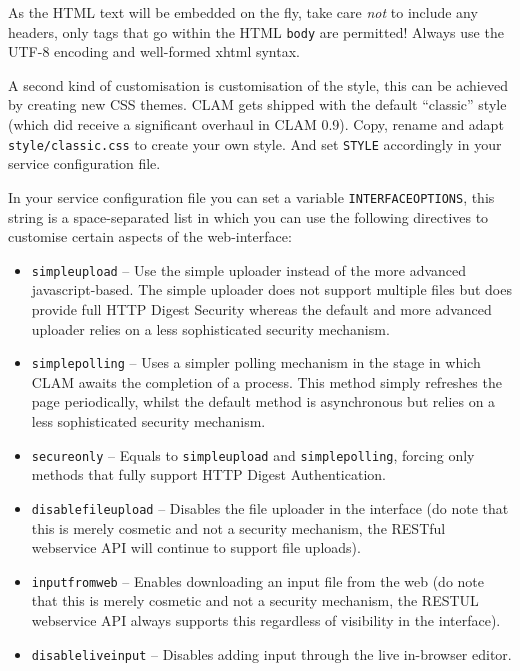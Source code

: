 \documentclass[a4paper,12pt]{report}
\begin{document}
As the HTML text will be embedded on the fly, take care \emph{not} to include
any headers, only tags that go within the HTML \texttt{body} are permitted!
Always use the UTF-8 encoding and well-formed xhtml syntax.

A second kind of customisation is customisation of the style, this can be
achieved by creating new CSS themes. CLAM gets shipped with the default
``classic'' style (which did receive a significant overhaul in CLAM 0.9). Copy,
rename and adapt \texttt{style/classic.css} to create your own style. And set
\texttt{STYLE} accordingly in your service configuration file.

In your service configuration file you can set a variable
\texttt{INTERFACEOPTIONS}, this string is a space-separated list in which you
can use the following directives to customise certain aspects of the
web-interface:

\begin{itemize}
\item \texttt{simpleupload} -- Use the simple uploader instead of the more advanced javascript-based. The simple uploader does not support multiple files but does provide full HTTP Digest Security whereas the default and more advanced uploader relies on a less sophisticated security mechanism.
\item \texttt{simplepolling} -- Uses a simpler polling mechanism in the stage in which CLAM awaits the completion of a process. This method simply refreshes the page periodically, whilst the default method is asynchronous but relies on a less sophisticated security mechanism. 
\item \texttt{secureonly} -- Equals to \texttt{simpleupload} and \texttt{simplepolling}, forcing only methods that fully support HTTP Digest Authentication.
\item \texttt{disablefileupload} -- Disables the file uploader in the interface (do note that this is merely cosmetic and not a security mechanism, the RESTful webservice API will continue to support file uploads).
\item \texttt{inputfromweb} -- Enables downloading an input file from the web (do note that this is merely cosmetic and not a security mechanism, the RESTUL webservice API always supports this regardless of visibility in the interface).
\item \texttt{disableliveinput} -- Disables adding input through the live in-browser editor. 
\end{itemize}
\end{document}
